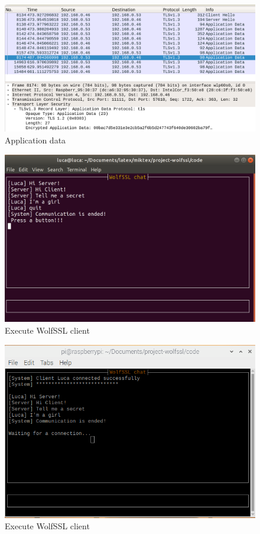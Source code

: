 \documentclass[a4paper,12pt]{report}
\begin{document}
\begin{figure}[H]
    \centering
    \includegraphics[scale=0.248]{./code/img/application_data.png}
    \caption{Application data}
    \label{fig:galaxy}
\end{figure}
\begin{figure}[H]
    \centering
    \includegraphics[scale=0.6]{./code/img/3-client.png}
    \caption{Execute WolfSSL client}
    \label{fig:galaxy}
\end{figure}
\begin{figure}[H]
    \centering
    \includegraphics[scale=0.6]{./code/img/4-server.png}
    \caption{Execute WolfSSL client}
    \label{fig:galaxy}
\end{figure}
\end{document}
